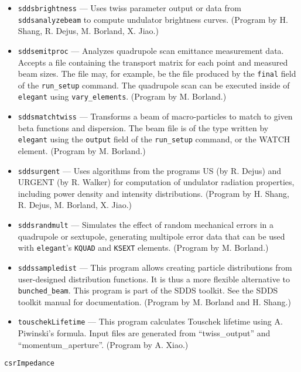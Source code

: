 \documentclass[11pt]{article}
\begin{document}
\begin{itemize}
\item {\tt sddsbrightness} --- Uses twiss parameter output or data from {\tt sddsanalyzebeam} to
  compute undulator brightness curves.  (Program by H. Shang, R. Dejus, M. Borland, X. Jiao.)
\item {\tt sddsemitproc} --- Analyzes quadrupole scan emittance measurement data.  Accepts a
        file containing the transport matrix for each point and measured beam sizes.  
        The file may, for example, be the file produced
        by the {\tt final} field of the {\tt run\_setup} command.  The quadrupole scan can be
        executed inside of {\tt elegant} using {\tt vary\_elements}. (Program by M. Borland.)
\item {\tt sddsmatchtwiss} --- Transforms a beam of macro-particles to match to given beta
        functions and dispersion.    The beam file
        is of the type written by {\tt elegant} using the {\tt output} field of the {\tt run\_setup}
        command, or the WATCH element. (Program by M. Borland.)
\item {\tt sddsurgent} --- Uses algorithms from the programs US (by R. Dejus) and URGENT (by R. Walker) for computation of undulator
  radiation properties, including power density and intensity distributions.  (Program by H. Shang, R. Dejus, M. Borland, X. Jiao.)
\item {\tt sddsrandmult} --- Simulates the effect of random mechanical errors in a quadrupole or sextupole,
  generating multipole error data that can be used with {\tt elegant}'s {\tt KQUAD} and {\tt KSEXT}
  elements. (Program by M. Borland.)
\item {\tt sddssampledist} --- This program allows creating particle
        distributions from user-designed distribution functions.  It is thus a more flexible alternative
        to \verb|bunched_beam|.  This program is part of the SDDS toolkit.  See the SDDS toolkit
        manual for documentation.  (Program by M. Borland and H. Shang.)
\item {\tt touschekLifetime} --- This program calculates Touschek lifetime using A. Piwinski's formula.
        Input files are generated from ``twiss\_output'' and ``momentum\_aperture''.  (Program by A. Xiao.)
\end{itemize}

\begin{latexonly}
\newpage
\begin{center}{\Large\verb|csrImpedance|}\end{center}
\end{latexonly}
\end{document}
